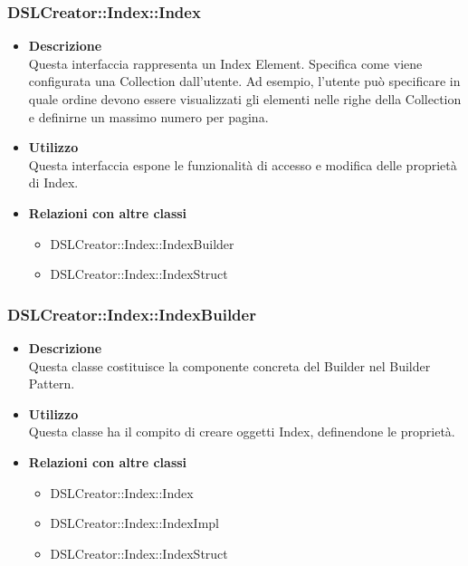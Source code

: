  \subsubsection{DSLCreator::Index::Index}
                    \begin{itemize}
                        \item \textbf{Descrizione} \hfill \\
                            Questa interfaccia rappresenta un Index Element. Specifica come viene configurata una Collection dall'utente. Ad esempio, l'utente può specificare in quale ordine devono essere visualizzati gli elementi nelle righe della Collection e definirne un massimo numero per pagina.
                        \item \textbf{Utilizzo} \hfill \\
                            Questa interfaccia espone le funzionalità di accesso e modifica delle proprietà di Index.
                        \item \textbf{Relazioni con altre classi}
                            \begin{itemize}
                              \item DSLCreator::Index::IndexBuilder
                              \item DSLCreator::Index::IndexStruct
                            \end{itemize}
                    \end{itemize}

 \subsubsection{DSLCreator::Index::IndexBuilder}
                    \begin{itemize}
                        \item \textbf{Descrizione} \hfill \\
                            Questa classe costituisce la componente concreta del Builder nel Builder Pattern.
                        \item \textbf{Utilizzo} \hfill \\
                            Questa classe ha il compito di creare oggetti Index, definendone le proprietà.
                        \item \textbf{Relazioni con altre classi}
                            \begin{itemize}
                              \item DSLCreator::Index::Index
                              \item DSLCreator::Index::IndexImpl
                              \item DSLCreator::Index::IndexStruct
                            \end{itemize}
                    \end{itemize}
  
